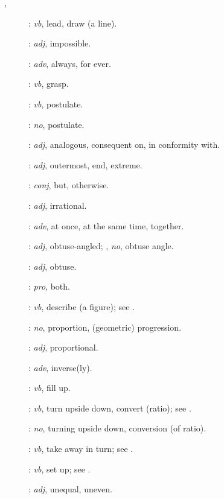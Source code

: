 {\begin{description}
\item [,]  :  {\em vb}, lead, draw (a line).
\item[]: {\em adj}, impossible.
\item[]: {\em adv}, always, for ever.
\item[]:
{\em vb}, grasp.
\item[]: {\em vb}, postulate.
\item[]: {\em no}, postulate.
\item[]: {\em adj}, analogous, consequent on, in conformity with.
\item[]: {\em adj}, outermost, end, extreme.
\item[]: {\em conj}, but, otherwise.
\item[]: {\em adj}, irrational.
\item[]: {\em adv}, at once, at the same time, together.
\item[]: {\em adj}, obtuse-angled; , {\em no}, obtuse angle.
\item[]: {\em adj}, obtuse.
\item[]: {\em pro}, both.
\item[]: {\em vb}, describe (a figure); see .
\item[]: {\em no}, proportion, (geometric) progression.
\item[]: {\em adj}, proportional.
\item[]: {\em adv}, inverse(ly).
\item[]: {\em vb}, fill up.
\item[]: {\em vb}, turn upside down, convert (ratio); see .
\item[]: {\em no}, turning upside down, conversion (of ratio).
\item[]: {\em vb}, take away in turn; see .
\item[]: {\em vb}, set up; see .
\item[]: {\em adj}, unequal, uneven.

\end{description}}
